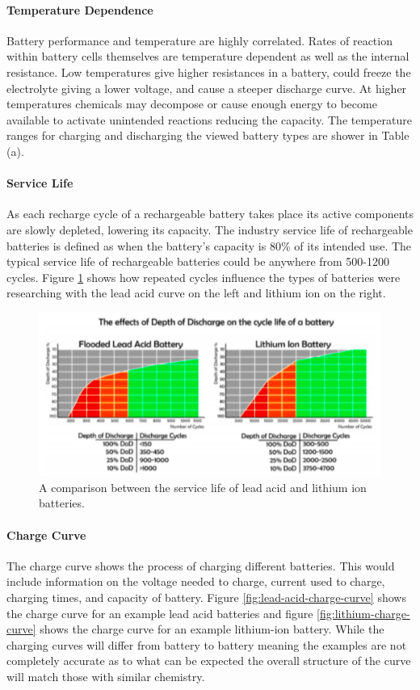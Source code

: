 \paragraph{Temperature Dependence}
Battery performance and temperature are highly correlated. Rates of reaction within battery cells themselves are temperature dependent as well as the internal resistance. Low temperatures give higher resistances in a battery, could freeze the electrolyte giving a lower voltage, and cause a steeper discharge curve. At higher temperatures chemicals may decompose or cause enough energy to become available to activate unintended reactions reducing the capacity. The temperature ranges for charging and discharging the viewed battery types are shower in Table (a). 

\paragraph{Service Life}
As each recharge cycle of a rechargeable battery takes place its active components are slowly depleted, lowering its capacity. The industry service life of rechargeable batteries is defined as when the battery's capacity is 80\% of its intended use. The typical service life of rechargeable batteries could be anywhere from 500-1200 cycles. Figure \ref{fig:service-life} shows how repeated cycles influence the types of batteries were researching with the lead acid curve on the left and lithium ion on the right.

\begin{figure}
    \centering
    \includegraphics[scale=0.5]{figures/service life.png}
    \caption{A comparison between the service life of lead acid and lithium ion batteries.}
    \label{fig:service-life} 
\end{figure}

\paragraph{Charge Curve}
The charge curve shows the process of charging different batteries. This would include information on the voltage needed to charge, current used to charge, charging times, and capacity of battery. Figure \ref{fig:lead-acid-charge-curve} shows the charge curve for an example lead acid batteries and figure \ref{fig:lithium-charge-curve} shows the charge curve for an example lithium-ion battery. While the charging curves will differ from battery to battery meaning the examples are not completely accurate as to what can be expected the overall structure of the curve will match those with similar chemistry.

